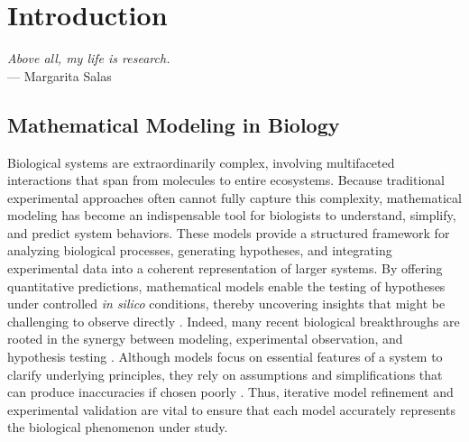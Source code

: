 \chapter{Introduction}
\begin{flushright}
    \textit{Above all, my life is research.}\\
    --- Margarita Salas
\end{flushright}

\vspace{1cm}

\section{Mathematical Modeling in Biology}
Biological systems are extraordinarily complex, involving multifaceted interactions that span from molecules to entire ecosystems. Because traditional experimental approaches often cannot fully capture this complexity, mathematical modeling has become an indispensable tool for biologists to understand, simplify, and predict system behaviors. These models provide a structured framework for analyzing biological processes, generating hypotheses, and integrating experimental data into a coherent representation of larger systems. By offering quantitative predictions, mathematical models enable the testing of hypotheses under controlled \textit{in silico} conditions, thereby uncovering insights that might be challenging to observe directly \cite{banwarth-kuhn2020how}. Indeed, many recent biological breakthroughs are rooted in the synergy between modeling, experimental observation, and hypothesis testing \cite{servedio2014not}. Although models focus on essential features of a system to clarify underlying principles, they rely on assumptions and simplifications that can produce inaccuracies if chosen poorly \cite{brown2018evaluating}. Thus, iterative model refinement and experimental validation are vital to ensure that each model accurately represents the biological phenomenon under study.

